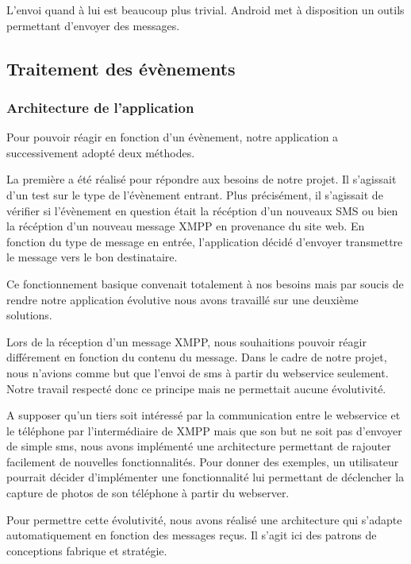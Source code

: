 L'envoi quand à lui est beaucoup plus trivial. Android met à disposition un outils permettant d'envoyer
des messages.


\subsection{Traitement des évènements}



\subsubsection{Architecture de l'application}

Pour pouvoir réagir en fonction d'un évènement, notre application a successivement adopté deux méthodes.

La première a été réalisé pour répondre aux besoins de notre projet. Il s'agissait d'un test sur le 
type de l'évènement entrant. Plus précisément, il s'agissait de vérifier si l'évènement en question 
était la récéption d'un nouveaux SMS ou bien la récéption d'un nouveau message XMPP en provenance du 
site web. En fonction du type de message en entrée, l'application décidé d'envoyer transmettre le message
vers le bon destinataire. 

Ce fonctionnement basique convenait totalement à nos besoins mais par soucis de rendre notre application
évolutive nous avons travaillé sur une deuxième solutions.

Lors de la réception d'un message XMPP, nous souhaitions pouvoir réagir différement en fonction du contenu
du message. Dans le cadre de notre projet, nous n'avions comme but que l'envoi de sms à partir du webservice
seulement. Notre travail respecté donc ce principe mais ne permettait aucune évolutivité.

A supposer qu'un tiers soit intéressé par la communication entre le webservice et le téléphone par 
l'intermédiaire de XMPP mais que son but ne soit pas d'envoyer de simple sms, nous avons implémenté une
architecture permettant de rajouter facilement de nouvelles fonctionnalités. Pour donner des exemples, 
un utilisateur pourrait décider d'implémenter une fonctionnalité lui permettant de déclencher la capture
de photos de son téléphone à partir du webserver.

Pour permettre cette évolutivité, nous avons réalisé une architecture qui s'adapte automatiquement en
fonction des messages reçus. Il s'agit ici des patrons de conceptions fabrique et stratégie. 
\\


